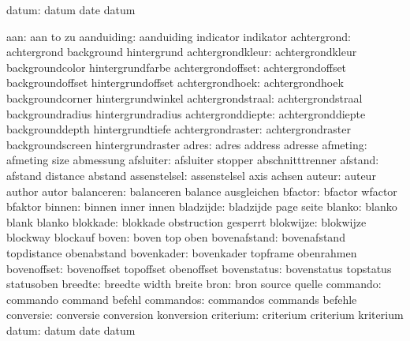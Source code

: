               datum:  datum                date                datum

                aan:  aan                  to                  zu
         aanduiding:  aanduiding           indicator           indikator
        achtergrond:  achtergrond          background          hintergrund
   achtergrondkleur:  achtergrondkleur     backgroundcolor     hintergrundfarbe
  achtergrondoffset:  achtergrondoffset    backgroundoffset    hintergrundoffset
    achtergrondhoek:  achtergrondhoek      backgroundcorner    hintergrundwinkel
  achtergrondstraal:  achtergrondstraal    backgroundradius    hintergrundradius
  achtergronddiepte:  achtergronddiepte    backgrounddepth     hintergrundtiefe
  achtergrondraster:  achtergrondraster    backgroundscreen    hintergrundraster
              adres:  adres                address             adresse
           afmeting:  afmeting             size                abmessung
          afsluiter:  afsluiter            stopper             abschnitttrenner
            afstand:  afstand              distance            abstand
       assenstelsel:  assenstelsel         axis                achsen
             auteur:  auteur               author              autor
         balanceren:  balanceren           balance             ausgleichen
            bfactor:  bfactor              wfactor             bfaktor
             binnen:  binnen               inner               innen
          bladzijde:  bladzijde            page                seite
             blanko:  blanko               blank               blanko
           blokkade:  blokkade             obstruction         gesperrt
          blokwijze:  blokwijze            blockway            blockauf
              boven:  boven                top                 oben
       bovenafstand:  bovenafstand         topdistance         obenabstand
         bovenkader:  bovenkader           topframe            obenrahmen
        bovenoffset:  bovenoffset          topoffset           obenoffset
        bovenstatus:  bovenstatus          topstatus           statusoben
            breedte:  breedte              width               breite
               bron:  bron                 source              quelle
           commando:  commando             command             befehl
          commandos:  commandos            commands            befehle
          conversie:  conversie            conversion          konversion
          criterium:  criterium            criterium           kriterium
              datum:  datum                date                datum
